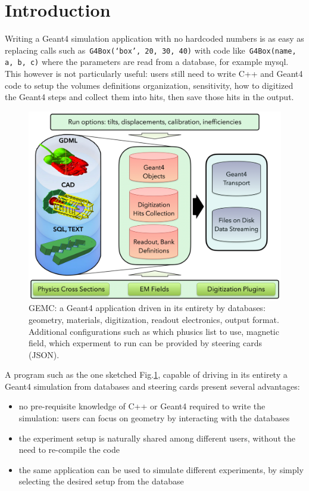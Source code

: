 \section{Introduction}
\label{sec:intro}

Writing a Geant4\cite{geant4} simulation application with no hardcoded numbers is
as easy as replacing calls such as~\verb|G4Box(‘box’, 20, 30, 40)| with
code like~\verb|G4Box(name, a, b, c)|
where the parameters are read from a database, for example mysql.
This however is not particularly useful: users still need to write C++ and Geant4 code to setup
the volumes definitions organization, sensitivity, how to digitized the Geant4 steps
and collect them into hits, then save those hits in the output.

\begin{figure}[h]
    \centering
    \includegraphics[width=.95\textwidth]{img/db}
    \caption{GEMC: a Geant4 application driven in its entirety by databases: geometry, materials,
        digitization, readout electronics, output format. Additional configurations such as which phusics
        list to use, magnetic field, which experment to run can be provided by steering cards (JSON).}
    \label{fig:db}
\end{figure}

A program such as the one sketched Fig.\ref{fig:db}, capable of driving in its entirety
a Geant4 simulation from databases and steering cards present several advantages:

\begin{itemize}
    \item no pre-requisite knowledge of C++ or Geant4 required to write the simulation:
    users can focus on geometry by interacting with the databases
    \item the experiment setup is naturally shared among different users,
    without the need to re-compile  the code
    \item the same application can be used to simulate different experiments,
    by simply selecting the desired setup from the database
\end{itemize}

